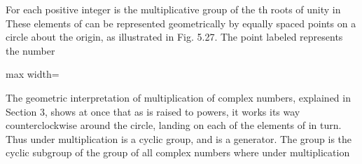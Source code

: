 \documentclass[11pt,oneside]{article}
\begin{document}
\begin{BookBody}
 For each positive integer  is the multiplicative group of the th roots of unity in  These elements of  can be represented geometrically by equally spaced points on a circle about the origin, as illustrated in Fig. 5.27. The point labeled represents the number

\begin{center}\begin{adjustbox}{max width=\linewidth}\end{adjustbox}\end{center}

\noindent The geometric interpretation of multiplication of complex numbers, explained in Section 3, shows at once that as \BookInline{\zeta } is raised to powers, it works its way counterclockwise around the circle, landing on each of the elements of  in turn. Thus  under multiplication is a cyclic group, and \BookInline{\zeta } is a generator. The group  is the cyclic subgroup \BookInline{\langle \zeta \rangle } of the group  of all complex numbers  where  under multiplication\BookEnd{\blacktriangle}

\end{BookBody}

\BookNarrativefalse
\end{document}
